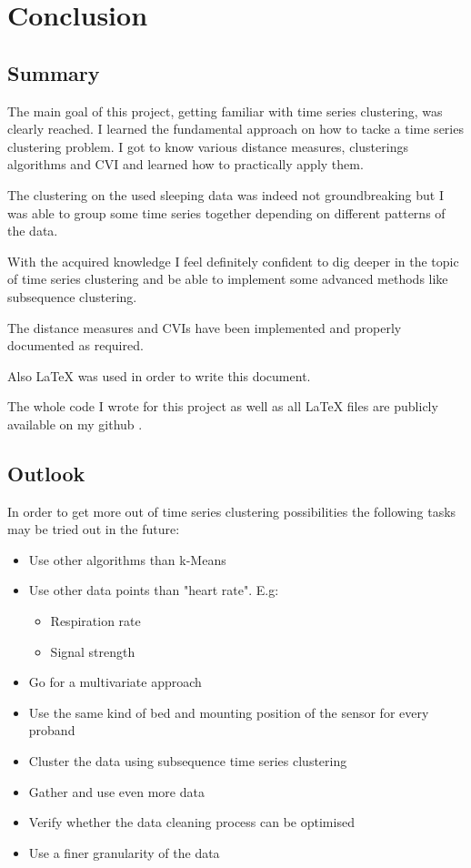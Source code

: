 \chapter{Conclusion}

\section{Summary}

The main goal of this project, getting familiar with time series clustering, was clearly reached. I learned the fundamental approach on how to tacke a time series clustering problem. I got to know various distance measures, clusterings algorithms and CVI and learned how to practically apply them.

The clustering on the used sleeping data was indeed not groundbreaking but I was able to group some time series together depending on different patterns of the data.

With the acquired knowledge I feel definitely confident to dig deeper in the topic of time series clustering and be able to implement some advanced methods like subsequence clustering.

The distance measures and CVIs have been implemented and properly documented as required.

Also LaTeX was used in order to write this document.

The whole code I wrote for this project as well as all LaTeX files are publicly available on my github .

\clearpage
\section{Outlook}

In order to get more out of time series clustering possibilities the following tasks may be tried out in the future:


\begin{itemize}
  \item Use other algorithms than k-Means
  \item Use other data points than "heart rate". E.g:
  \begin{itemize}
  	\item Respiration rate
  	\item Signal strength
  \end{itemize}
  \item Go for a multivariate approach
  \item Use the same kind of bed and mounting position of the sensor for every proband
  \item Cluster the data using subsequence time series clustering
  \item Gather and use even more data
  \item Verify whether the data cleaning process can be optimised
  \item Use a finer granularity of the data
\end{itemize}
